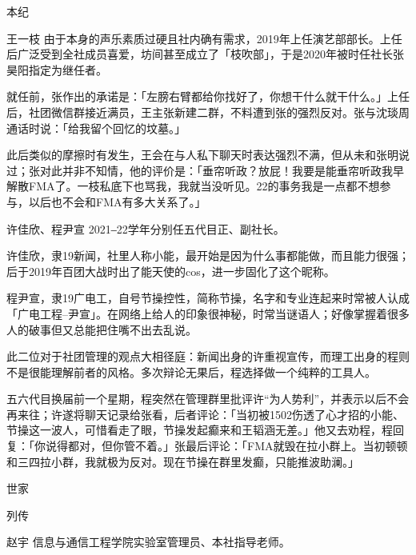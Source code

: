 \documentclass{paper}
\begin{document}
\begin{section}{本纪}
\begin{subsection}{王一枝}
		由于本身的声乐素质过硬且社内确有需求，2019年上任演艺部部长。上任后广泛受到全社成员喜爱，坊间甚至成立了「枝吹部」，于是2020年被时任社长张昊阳指定为继任者。
		
		就任前，张作出的承诺是：「左膀右臂都给你找好了，你想干什么就干什么。」上任后，社团微信群接近满员，王主张新建二群，不料遭到张的强烈反对。张与沈琰周通话时说：「给我留个回忆的坟墓。」
		
		此后类似的摩擦时有发生，王会在与人私下聊天时表达强烈不满，但从未和张明说过；张对此并非不知情，他的评价是：「垂帘听政？放屁！我要是能垂帘听政我早解散FMA了。一枝私底下也骂我，我就当没听见。22的事务我是一点都不想参与，以后也不会和FMA有多大关系了。」
	\end{subsection}
	\begin{subsection}{许佳欣、程尹宣}
		2021‒22学年分别任五代目正、副社长。

		许佳欣，隶19新闻，社里人称小能，最开始是因为什么事都能做，而且能力很强；后于2019年百团大战时出了能天使的cos，进一步固化了这个昵称。

		程尹宣，隶19广电工，自号节操控性，简称节操，名字和专业连起来时常被人认成「广电工程--尹宣」。在网络上给人的印象很神秘，时常当谜语人；好像掌握着很多人的破事但又总能把住嘴不出去乱说。

		此二位对于社团管理的观点大相径庭：新闻出身的许重视宣传，而理工出身的程则不是很能理解前者的风格。多次辩论无果后，程选择做一个纯粹的工具人。

		五六代目换届前一个星期，程突然在管理群里批评许“为人势利”，并表示以后不会再来往；许遂将聊天记录给张看，后者评论：「当初被1502伤透了心才招的小能、节操这一波人，可惜看走了眼，节操发起癫来和王韬涵无差。」他又去劝程，程回复：「你说得都对，但你管不着。」张最后评论：「FMA就毁在拉小群上。当初顿顿和三四拉小群，我就极为反对。现在节操在群里发癫，只能推波助澜。」
	\end{subsection}
\end{section}

\newpage
\begin{section}{世家}
\end{section}

\newpage
\begin{section}{列传}
	\begin{subsection}{赵宇}
		信息与通信工程学院实验室管理员、本社指导老师。
	\end{subsection}
\end{section}
\end{document}
